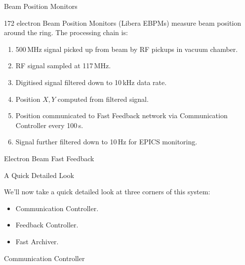 \documentclass{beamer}
\begin{document}
%
\begin{frame}{Beam Position Monitors}

172 electron Beam Position Monitors (Libera EBPMs) measure beam position around
the ring.  The processing chain is:

\begin{enumerate}
\item 500\,MHz signal picked up from beam by RF pickups in vacuum chamber.
\item RF signal sampled at 117\,MHz.
\item Digitised signal filtered down to 10\,kHz data rate.
\item Position $X,Y$ computed from filtered signal.
\item Position communicated to Fast Feedback network via Communication
Controller every 100\,\textmu s.
\item Signal further filtered down to 10\,Hz for EPICS monitoring.
\end{enumerate}

\end{frame}


%
\begin{frame}{Electron Beam Fast Feedback}
\begin{center}

\end{center}
\end{frame}


%
\begin{frame}{A Quick Detailed Look}

We'll now take a quick detailed look at three corners of this system:

\begin{itemize}
\item Communication Controller.
\item Feedback Controller.
\item Fast Archiver.
\end{itemize}

\end{frame}


%
\begin{frame}{Communication Controller}
\end{frame}
\end{document}
